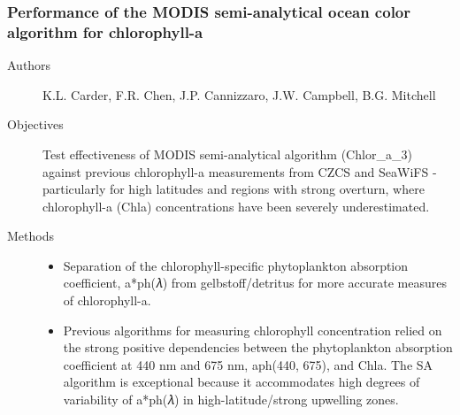 \begin{frame}\frametitle{Performance of the MODIS semi-analytical ocean color algorithm for chlorophyll-a} 
\begin{description}
    \item[Authors] K.L. Carder, F.R. Chen, J.P. Cannizzaro, J.W. Campbell, B.G. Mitchell
    \item[Objectives] Test effectiveness of MODIS semi-analytical algorithm (Chlor_a_3) against previous chlorophyll-a measurements from CZCS and SeaWiFS - particularly for high latitudes and regions with strong overturn, where chlorophyll-a (Chla) concentrations have been severely underestimated.
    
    \item[Methods] 
        \begin{itemize}
            \item Separation of the chlorophyll-specific phytoplankton absorption coefficient, a*ph(𝜆) from gelbstoff/detritus for                 more accurate measures of chlorophyll-a.
            
            \item Previous algorithms for measuring chlorophyll concentration relied on the strong positive dependencies between the phytoplankton absorption coefficient at 440 nm and 675 nm, aph(440, 675), and Chla. The SA algorithm is exceptional because it accommodates high degrees of variability of a*ph(𝜆) in high-latitude/strong upwelling zones.
        \end{itemize}
\end{description}
\end{frame}

